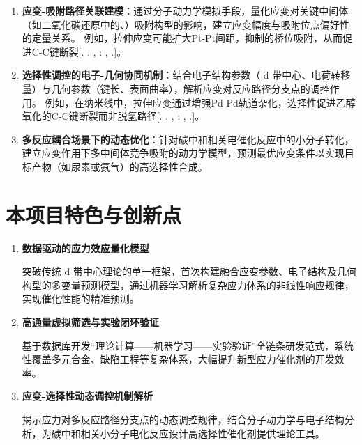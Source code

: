 \begin{enumerate}
	\item
	      \textbf{应变-吸附路径关联建模}：通过分子动力学模拟手段，量化应变对关键中间体（如二氧化碳还原中的、）吸附构型的影响，建立应变幅度与吸附位点偏好性的定量关系。
		  例如，拉伸应变可能扩大Pt-Pt间距，抑制的桥位吸附，从而促进C-C键断裂[\@. \@. \@,
	      \thinspace{}\textnormal{:
	      }\@, \@.]。
	\item
	      \textbf{选择性调控的电子-几何协同机制}：结合电子结构参数（ d 带中心、电荷转移量）与几何参数（键长、表面曲率），解析应变对反应路径分支点的调控作用。
		  例如，在纳米线中，拉伸应变通过增强Pd-Pd轨道杂化，选择性促进乙醇氧化的C-C键断裂而非脱氢路径[\@. \@. \@,
	      \thinspace{}\textnormal{:
	      }\@, \@.]。
	\item
	      \textbf{多反应耦合场景下的动态优化}：针对碳中和相关电催化反应中的小分子转化，建立应变作用下多中间体竞争吸附的动力学模型，预测最优应变条件以实现目标产物（如尿素或氨气）的高选择性合成。
\end{enumerate}

\section{本项目特色与创新点}

\begin{enumerate}
	\item \textbf{数据驱动的应力效应量化模型}

	      突破传统 d 带中心理论的单一框架，首次构建融合应变参数、电子结构及几何构型的多变量预测模型，通过机器学习解析复杂应力体系的非线性响应规律，实现催化性能的精准预测。
	\item \textbf{高通量虚拟筛选与实验闭环验证}

	      基于数据库开发``理论计算——机器学习——实验验证''全链条研发范式，系统性覆盖多元合金、缺陷工程等复杂体系，大幅提升新型应力催化剂的开发效率。

	\item \textbf{应变-选择性动态调控机制解析}

	      揭示应力对多反应路径分支点的动态调控规律，结合分子动力学与电子结构分析，为碳中和相关小分子电化反应设计高选择性催化剂提供理论工具。
\end{enumerate}

